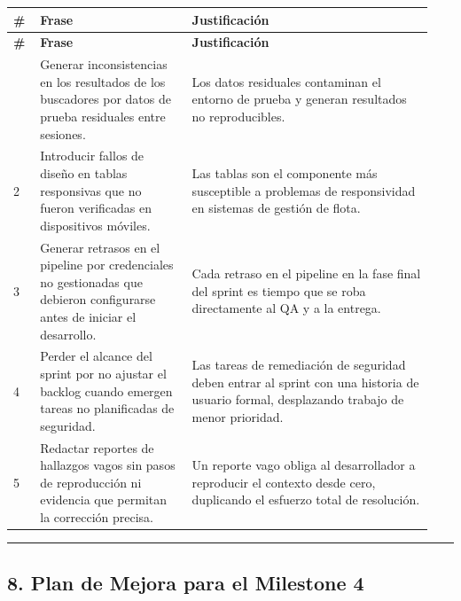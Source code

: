 \documentclass[11pt,a4paper]{article}
\begin{document}
\begingroup
\scriptsize
\setlength{\tabcolsep}{3pt}
\begin{longtable}{P{0.06\linewidth}P{0.34\linewidth}P{0.54\linewidth}}
\toprule
\textbf{\#} & \textbf{Frase} & \textbf{Justificación} \\
\midrule
\endfirsthead
\toprule
\textbf{\#} & \textbf{Frase} & \textbf{Justificación} \\
\midrule
\endhead
\bottomrule
{} & Generar inconsistencias en los resultados de los buscadores por datos de prueba residuales entre sesiones. & Los datos residuales contaminan el entorno de prueba y generan resultados no reproducibles. \\
2 & Introducir fallos de diseño en tablas responsivas que no fueron verificadas en dispositivos móviles. & Las tablas son el componente más susceptible a problemas de responsividad en sistemas de gestión de flota. \\
3 & Generar retrasos en el pipeline por credenciales no gestionadas que debieron configurarse antes de iniciar el desarrollo. & Cada retraso en el pipeline en la fase final del sprint es tiempo que se roba directamente al QA y a la entrega. \\
4 & Perder el alcance del sprint por no ajustar el backlog cuando emergen tareas no planificadas de seguridad. & Las tareas de remediación de seguridad deben entrar al sprint con una historia de usuario formal, desplazando trabajo de menor prioridad. \\
5 & Redactar reportes de hallazgos vagos sin pasos de reproducción ni evidencia que permitan la corrección precisa. & Un reporte vago obliga al desarrollador a reproducir el contexto desde cero, duplicando el esfuerzo total de resolución. \\
\end{longtable}
\endgroup

\vspace{0.6em}\hrule\vspace{0.8em}

\subsection{8. Plan de Mejora para el Milestone 4}
\end{document}
